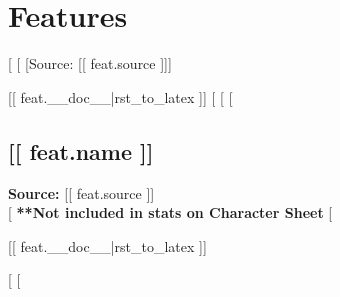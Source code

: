  \section*{Features}
[%
  [%
    [Source: [[ feat.source ]]]

    [[ feat.__doc__|rst_to_latex ]]
  [%
[%
  [%

    \subsection*{[[ feat.name ]]}

    \noindent
    \textbf{Source:} [[ feat.source ]] \\

    [%
      \textbf{**Not included in stats on Character Sheet} %
    [%
              
    [[ feat.__doc__|rst_to_latex ]]

  [%
[%